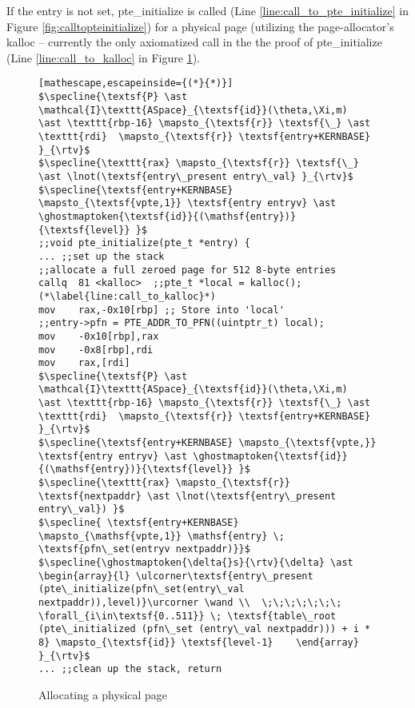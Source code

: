 If the entry is not set, \textsf{pte\_initialize} is called (Line \ref{line:call_to_pte_initialize} in Figure \ref{fig:calltopteinitialize}) 
for a physical page (utilizing the page-allocator's \textsf{kalloc} -- currently the only axiomatized call in the the proof of \textsf{pte\_initialize} 
(Line \ref{line:call_to_kalloc} in Figure \ref{pteinitializespec}). 
\begin{figure}\footnotesize
  \begin{lstlisting}[mathescape,escapeinside={(*}{*)}]
$\specline{\textsf{P} \ast \mathcal{I}\texttt{ASpace}_{\textsf{id}}(\theta,\Xi,m)   \ast \texttt{rbp-16} \mapsto_{\textsf{r}} \textsf{\_} \ast \texttt{rdi}  \mapsto_{\textsf{r}} \textsf{entry+KERNBASE}  }_{\rtv}$
$\specline{\texttt{rax} \mapsto_{\textsf{r}} \textsf{\_} \ast \lnot(\textsf{entry\_present entry\_val} }_{\rtv}$
$\specline{\textsf{entry+KERNBASE} \mapsto_{\textsf{vpte,1}} \textsf{entry entryv} \ast \ghostmaptoken{\textsf{id}}{(\mathsf{entry})}{\textsf{level}} }$
;;void pte_initialize(pte_t *entry) {
... ;;set up the stack    
;;allocate a full zeroed page for 512 8-byte entries 
callq  81 <kalloc>	;;pte_t *local = kalloc();(*\label{line:call_to_kalloc}*)
mov    rax,-0x10[rbp] ;; Store into 'local'
;;entry->pfn = PTE_ADDR_TO_PFN((uintptr_t) local);
mov    -0x10[rbp],rax
mov    -0x8[rbp],rdi
mov    rax,[rdi]
$\specline{\textsf{P} \ast \mathcal{I}\texttt{ASpace}_{\textsf{id}}(\theta,\Xi,m)   \ast \texttt{rbp-16} \mapsto_{\textsf{r}} \textsf{\_} \ast \texttt{rdi}  \mapsto_{\textsf{r}} \textsf{entry+KERNBASE} }_{\rtv}$
$\specline{\textsf{entry+KERNBASE} \mapsto_{\textsf{vpte,}} \textsf{entry entryv} \ast \ghostmaptoken{\textsf{id}}{(\mathsf{entry})}{\textsf{level}} }$
$\specline{\texttt{rax} \mapsto_{\textsf{r}} \textsf{nextpaddr} \ast \lnot(\textsf{entry\_present entry\_val}) }$
$\specline{ \textsf{entry+KERNBASE} \mapsto_{\mathsf{vpte,1}} \mathsf{entry} \; \textsf{pfn\_set(entryv nextpaddr)}}$
$\specline{\ghostmaptoken{\delta{}s}{\rtv}{\delta} \ast \begin{array}{l} \ulcorner\textsf{entry\_present (pte\_initialize(pfn\_set(entry\_val nextpaddr)),level)}\urcorner \wand \\  \;\;\;\;\;\;\; \forall_{i\in\textsf{0..511}} \; \textsf{table\_root (pte\_initialized (pfn\_set (entry\_val nextpaddr))) + i * 8} \mapsto_{\textsf{id}} \textsf{level-1}    \end{array}  }_{\rtv}$
... ;;clean up the stack, return
\end{lstlisting}
\vspace{-1em}
\caption{Allocating a physical page }
\label{pteinitializespec}
\end{figure}

